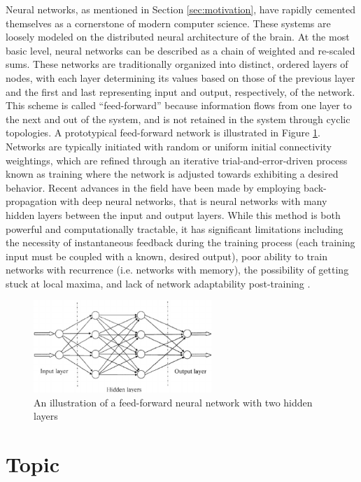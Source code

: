 \documentclass[a4paper]{article}
\begin{document}
Neural networks, as mentioned in Section \ref{sec:motivation}, have rapidly cemented themselves as a cornerstone of modern computer science. These systems are loosely modeled on the distributed neural architecture of the brain. At the most basic level, neural networks can be described as a chain of weighted and re-scaled sums. These networks are traditionally organized into distinct, ordered layers of nodes, with each layer determining its values based on those of the previous layer and the first and last representing input and output, respectively, of the network. This scheme is called ``feed-forward'' because information flows from one layer to the next and out of the system, and is not retained in the system through cyclic topologies. A prototypical feed-forward network is illustrated in Figure \ref{fig:feed_forward}. Networks are typically initiated with random or uniform initial connectivity weightings, which are refined through an iterative trial-and-error-driven process known as training where the network is adjusted towards exhibiting a desired behavior. Recent advances in the field have been made by employing back-propagation with deep neural networks, that is neural networks with many hidden layers between the input and output layers. While this method is both powerful and computationally tractable, it has significant limitations  including the necessity of instantaneous feedback during the training process (each training input must be coupled with a known, desired output), poor ability to train networks with recurrence (i.e. networks with memory), the possibility of getting stuck at local maxima, and lack of network adaptability post-training \cite[pg 312, 364]{DowningIntelligenceSystems}. 
\begin{figure}
\centering
\includegraphics[width=0.6\textwidth]{Fig-1-Schematic-diagram-of-a-multilayer-feed-forward-neural-network-3.png}
\caption{\label{fig:feed_forward} An illustration of a feed-forward neural network with two hidden layers \cite{Griffiths2015IntroductionAnalysis}} 
\end{figure}


\section{Topic}
\end{document}
